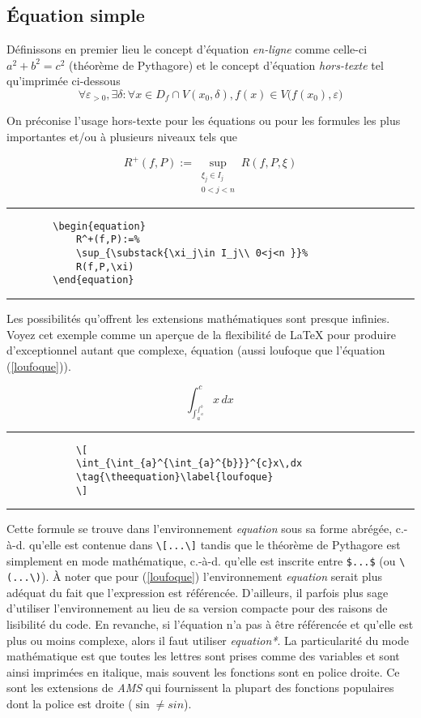 	\subsection*{Équation simple}
	Définissons en premier lieu le concept d'équation \textit{en-ligne} comme celle-ci $a^2+b^2=c^2$ (théorème de Pythagore) et le concept d'équation  \textit{hors-texte}  tel qu'imprimée ci-dessous 
	\[
	\forall\varepsilon_{>0},\exists\delta : \forall x \in D_f \cap V(x_0,\delta), f(x)\in V\big(f(x_0),\varepsilon\big)
	\]
	\par On préconise l'usage hors-texte pour les équations ou pour les formules les plus importantes et/ou à plusieurs niveaux tels que
%
	\begin{table}[H]
		\centering
		\begin{equation}
		R^+(f,P):=\sup_{\substack{\xi_j\in I_j \\
				0<j<n }}
		R(f,P,\xi)\label{darboux}
		\end{equation}	
		\hrule
		\begin{verbatim}
		\begin{equation}
		    R^+(f,P):=%
		    \sup_{\substack{\xi_j\in I_j\\ 0<j<n }}%
		    R(f,P,\xi)
		\end{equation}
		\end{verbatim}
		\hrule
	\end{table}
%
	\par Les possibilités qu'offrent les extensions mathématiques sont presque infinies. Voyez cet exemple comme un aperçue de la flexibilité de \LaTeX{} pour produire d'exceptionnel autant que complexe, équation (aussi loufoque que l'équation (\ref{loufoque})).
%
	\begin{table}[H]
		\setcounter{equation}{2}
		\centering
		\[
		\int_{\int_{a}^{\int_{a}^{b}}}^{c}x\,dx\, 
		\tag{\theequation}\label{loufoque}
		\]
		\hrule
		\begin{verbatim}
			\[
			\int_{\int_{a}^{\int_{a}^{b}}}^{c}x\,dx
			\tag{\theequation}\label{loufoque}
			\]
		\end{verbatim}
		\hrule
	\end{table}
%
\break
	\par Cette formule se trouve dans l'environnement \textit{equation} sous sa forme abrégée, c.-à-d. qu'elle est contenue dans \verb|\[...\]| tandis que le théorème de Pythagore est simplement en mode mathématique, c.-à-d. qu'elle est inscrite entre  \verb|$...$| (ou \verb|\(...\)|). À noter que pour (\ref{loufoque}) l'environnement \textit{equation} serait plus adéquat du fait que l'expression est référencée. D'ailleurs, il parfois plus sage d'utiliser l'environnement au lieu de sa version compacte pour des raisons de lisibilité du code. En revanche, si l'équation n'a pas à être référencée et qu'elle est plus ou moins complexe, alors il faut utiliser \textit{equation*}. La particularité du mode mathématique est que toutes les lettres sont prises comme des variables et sont ainsi imprimées en italique, mais souvent les fonctions sont en police droite. Ce sont les extensions de \textit{AMS} qui fournissent la plupart des fonctions populaires dont la police est droite ($\sin \neq sin$). %
